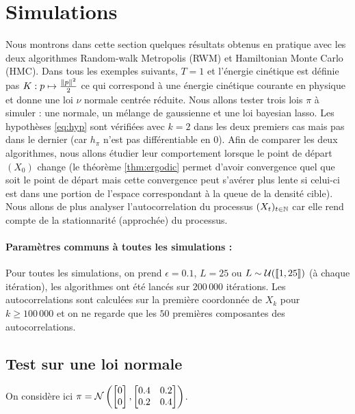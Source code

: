 \documentclass[10pt,a4paper]{article}
\begin{document}
\section{Simulations}
Nous montrons dans cette section quelques résultats obtenus en pratique avec les deux algorithmes Random-walk Metropolis (RWM) et Hamiltonian Monte Carlo (HMC). Dans tous les exemples suivants, $T = 1$ et l'énergie cinétique est définie pas $K : p \mapsto \frac{{ \left\| p \right\|}^2}{2}$ ce qui correspond à une énergie cinétique courante en physique et donne une loi $\nu$ normale centrée réduite. Nous allons tester trois lois $\pi$ à simuler : une normale, un mélange de gaussienne et une loi bayesian lasso. Les hypothèses \eqref{eq:hyp} sont vérifiées avec $k = 2$ dans les deux premiers cas mais pas dans le dernier (car $h_\pi$ n'est pas différentiable en 0). Afin de comparer les deux algorithmes, nous allons étudier leur comportement lorsque le point de départ $(X_0)$ change (le théorème \ref{thm:ergodic} permet d'avoir convergence quel que soit le point de départ mais cette convergence peut s'avérer plus lente si celui-ci est dans une portion de l'espace correspondant à la queue de la densité cible). Nous allons de plus analyser l'autocorrelation du processus $(X_t)_{t \in \mathbb{N}}$ car elle rend compte de la stationnarité (approchée) du processus.

\paragraph{Paramètres communs à toutes les simulations :}
Pour toutes les simulations, on prend $\epsilon = 0.1$, $L = 25$ ou $L \sim \mathcal{U}({\left\llbracket 1,25 \right\rrbracket})$ (à chaque itération), les algorithmes ont été lancés sur $200\,000$ itérations. Les autocorrelations sont calculées sur la première coordonnée de $X_k$ pour $k \geq 100\,000$ et on ne regarde que les $50$ premières composantes des autocorrelations.

\subsection{Test sur une loi normale}
On considère ici $\pi = \mathcal{N}\left(\begin{bmatrix} 0 \\ 0 \end{bmatrix}, \begin{bmatrix} 0.4 & 0.2 \\ 0.2 & 0.4  \end{bmatrix} \right)$.
\end{document}
